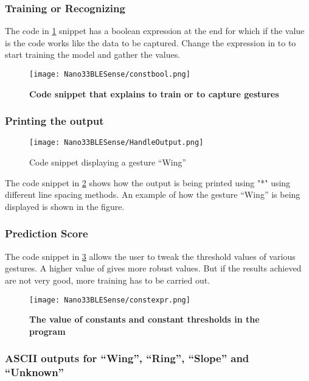 \subsubsection{Training or Recognizing} 

The code in \ref{fig:img10} snippet has a boolean expression at the end for which if the value is  the code works like the data to be captured. Change the expression in to  to start training the model and gather the values.

\begin{figure}[h!]
    \texttt{[image: Nano33BLESense/constbool.png]}
    \caption{\textbf{Code snippet that explains to train or to capture gestures}}
    \label{fig:img10}
\end{figure}


\subsubsection{Printing the output}


\begin{figure}[h!]
    \texttt{[image: Nano33BLESense/HandleOutput.png]}
    \caption{Code snippet displaying a  gesture ``Wing''}
    \label{fig:img12}
\end{figure}

The code snippet in \ref{fig:img12} shows how the output is being printed using "*" using different line spacing methods. An example of how the gesture ``Wing'' is being displayed is shown in the figure.

\subsubsection{Prediction Score}

The code snippet in \ref{fig:img11}  allows the user to tweak the threshold values of various gestures. A higher value of  gives more robust values. But if the results achieved are not very good, more training has to be carried out.

\begin{figure}[h!]
    \texttt{[image: Nano33BLESense/constexpr.png]}
    \caption{\textbf{The value of constants and constant thresholds in the program}}
    \label{fig:img11}
\end{figure}

\subsubsection{ASCII outputs for ``Wing'', ``Ring'', ``Slope'' and ``Unknown''}

